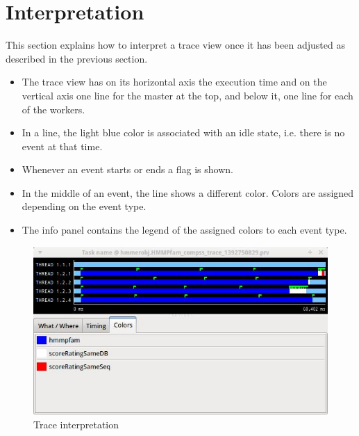 \section{Interpretation}
\label{sec:Interpretation}

This section explains how to interpret a trace view once it has been adjusted as 
described in the previous section.

\begin{itemize}
 \item The trace view has on its horizontal axis the execution time and on the vertical 
       axis one line for the master at the top, and below it, one line for each of the workers.
 \item In a line, the light blue color is associated with an idle state, i.e. there is no event at that time.
 \item Whenever an event starts or ends a flag is shown.
 \item In the middle of an event, the line shows a different color. Colors are assigned depending on the event type.
 \item The info panel contains the legend of the assigned colors to each event type.
\end{itemize}

\begin{figure}[ht!]
  \centering
    \includegraphics[width=\textwidth]{./Sections/4_Interpretation/Figures/7.jpeg}
    \caption{Trace interpretation}
\end{figure}